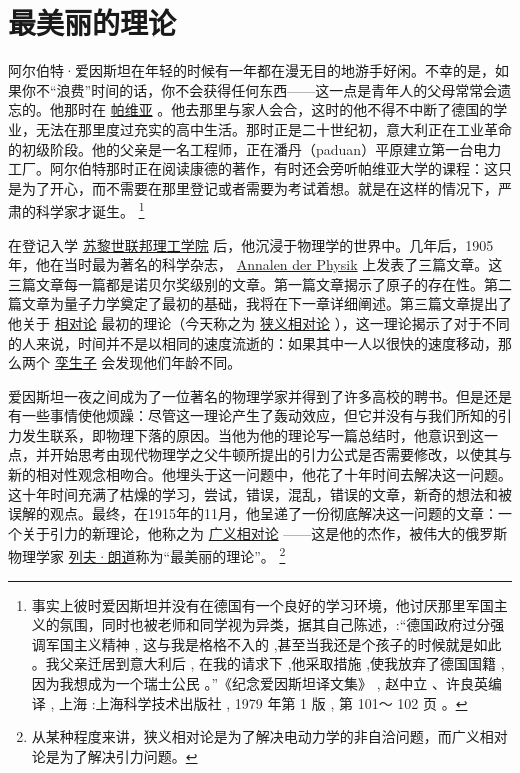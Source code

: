 	\chapter{最美丽的理论}
\indent

    阿尔伯特·爱因斯坦在年轻的时候有一年都在漫无目的地游手好闲。不幸的是，如果你不“浪费”时间的话，你不会获得任何东西——这一点是青年人的父母常常会遗忘的。他那时在
\href{http://toyhouse.cc/wiki/index.php/帕维亚}{帕维亚}
。他去那里与家人会合，这时的他不得不中断了德国的学业，无法在那里度过充实的高中生活。那时正是二十世纪初，意大利正在工业革命的初级阶段。他的父亲是一名工程师，正在潘丹（paduan）平原建立第一台电力工厂。阿尔伯特那时正在阅读康德的著作，有时还会旁听帕维亚大学的课程：这只是为了开心，而不需要在那里登记或者需要为考试着想。就是在这样的情况下，严肃的科学家才诞生。
\footnote[1]
{
事实上彼时爱因斯坦并没有在德国有一个良好的学习环境，他讨厌那里军国主义的氛围，同时也被老师和同学视为异类，据其自己陈述，:“德国政府过分强调军国主义精神 , 这与我是格格不入的 ,甚至当我还是个孩子的时候就是如此 。我父亲迁居到意大利后 , 在我的请求下 ,他采取措施 ,使我放弃了德国国籍 , 因为我想成为一个瑞士公民 。”《纪念爱因斯坦译文集》 , 赵中立 、许良英编译 , 上海 :上海科学技术出版社 , 1979 年第 1 版 , 第 101～ 102 页 。
}
    
    在登记入学
\href{http://toyhouse.cc/wiki/index.php/苏黎世联邦理工学院}{苏黎世联邦理工学院}
后，他沉浸于物理学的世界中。几年后，1905年，他在当时最为著名的科学杂志，
\href{https://en.wikipedia.org/wiki/Annalen_der_Physik}{Annalen der Physik}
上发表了三篇文章。这三篇文章每一篇都是诺贝尔奖级别的文章。第一篇文章揭示了原子的存在性。第二篇文章为量子力学奠定了最初的基础，我将在下一章详细阐述。第三篇文章提出了他关于
\href{http://toyhouse.cc/wiki/index.php/相对论}{相对论}
最初的理论（今天称之为
\href{http://toyhouse.cc/wiki/index.php/狭义相对论}{狭义相对论}
），这一理论揭示了对于不同的人来说，时间并不是以相同的速度流逝的：如果其中一人以很快的速度移动，那么两个
\href{http://toyhouse.cc/wiki/index.php/孪生子}{孪生子}
会发现他们年龄不同。

    爱因斯坦一夜之间成为了一位著名的物理学家并得到了许多高校的聘书。但是还是有一些事情使他烦躁：尽管这一理论产生了轰动效应，但它并没有与我们所知的引力发生联系，即物理下落的原因。当他为他的理论写一篇总结时，他意识到这一点，并开始思考由现代物理学之父牛顿所提出的引力公式是否需要修改，以使其与新的相对性观念相吻合。他埋头于这一问题中，他花了十年时间去解决这一问题。这十年时间充满了枯燥的学习，尝试，错误，混乱，错误的文章，新奇的想法和被误解的观点。最终，在1915年的11月，他呈递了一份彻底解决这一问题的文章：一个关于引力的新理论，他称之为
\href{http://toyhouse.cc/wiki/index.php/广义相对论}{广义相对论}
——这是他的杰作，被伟大的俄罗斯物理学家
\href{https://en.wikipedia.org/wiki/Lev_Davidovich_Landau}{列夫·朗道}称为“最美丽的理论”。
\footnote[2]
{
从某种程度来讲，狭义相对论是为了解决电动力学的非自洽问题，而广义相对论是为了解决引力问题。
}

